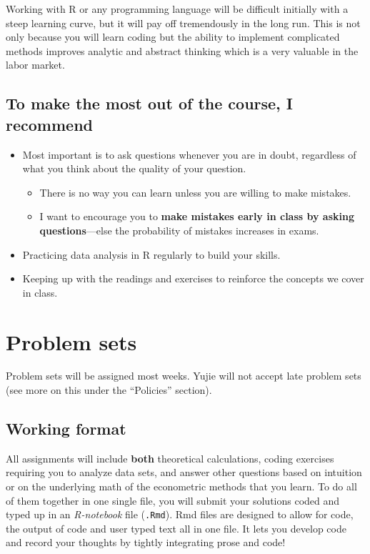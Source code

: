 \documentclass[11pt]{article}
\newcommand{\TAShort}{Yujie}
\begin{document}
Working with R or any programming language will be difficult initially with a
steep learning curve, but it will pay off tremendously in the long run. This is
not only because you will learn coding but the ability to implement complicated
methods improves analytic and abstract thinking which is a very valuable in the
labor market.

\subsection{To make the most out of the course, I recommend}
\begin{itemize}
  \item Most important is to ask questions whenever you are in doubt, regardless
        of what you think about the quality of your question.
        \begin{itemize}
          \item There is no way you can learn unless you are willing to make
                mistakes.
          \item I want to encourage you to \textbf{make mistakes early in class
                by asking questions}---else the probability of mistakes
                increases in exams.
        \end{itemize}
  \item Practicing data analysis in R regularly to build your skills.
  \item Keeping up with the readings and exercises to reinforce the concepts we
        cover in class.
\end{itemize}

\section{Problem sets}

Problem sets will be assigned most weeks. \TAShort{} will not accept late problem
sets (see more on this under the ``Policies'' section).

\subsection{Working format}
All assignments will include \textbf{both} theoretical calculations, coding
exercises requiring you to analyze data sets, and answer other questions based on
intuition or on the underlying math of the econometric methods that you learn. To
do all of them together in one single file, you will submit your solutions coded
and typed up in an \emph{R-notebook} file (\texttt{.Rmd}). Rmd files are designed
to allow for code, the output of code and user typed text all in one file. It
lets you develop code and record your thoughts by tightly integrating prose and
code!
\end{document}
